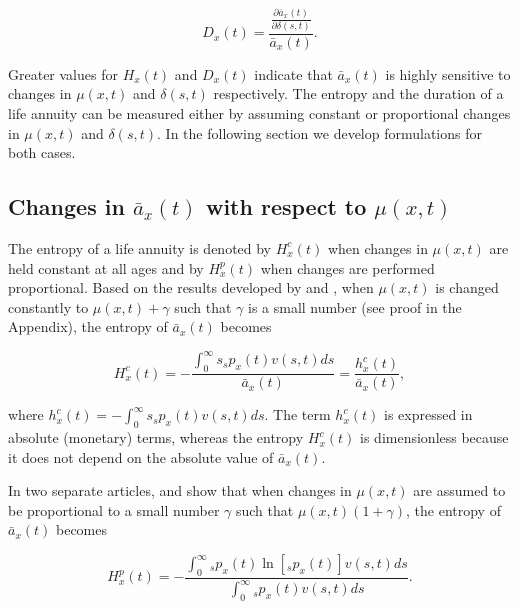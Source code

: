 \documentclass[12pt]{article}
\begin{document}
\begin{equation}\label{eq:DurationGeneral}
{D}_{x}(t) = \frac{ \frac{\partial \bar{a}_x(t) }{\partial \delta(s,t)}}{\bar{a}_x(t)}.
\end{equation}

Greater values for ${H}_{x}(t)$ and ${D}_{x}(t)$ indicate that $\bar{a}_x(t)$ is highly sensitive to changes in $\mu(x,t)$ and $\delta(s,t)$ respectively. The entropy and the duration of a life annuity can be measured either by assuming constant or proportional changes in $\mu(x,t)$ and $\delta(s,t)$. In the following section we develop formulations for both cases. 



\subsection{Changes in $\bar{a}_x(t)$ with respect to $\mu(x,t)$}

The entropy of a life annuity is denoted by ${H}^{c}_{x}(t)$ when changes in $\mu(x,t)$ are held constant at all ages and by ${H}^{p}_{x}(t)$ when  changes are performed proportional. Based on the results developed by \citet{Tsai2013a} and \citet{Lin2020}, when $\mu(x,t)$ is changed constantly to $\mu(x,t)+\gamma$ such that $\gamma$ is a small number (see proof in the Appendix), the entropy of $\bar{a}_x(t)$ becomes

\begin{equation}\label{eq:EntropyC}
{H}^{c}_{x}(t) = -\frac{\int_{0}^\infty s {}_sp_x(t) {v}(s,t) ds}{\bar{a}_x(t)}=\frac{{h}^{c}_{x}(t)}{\bar{a}_x(t)},
\end{equation}

where ${h}^{c}_{x}(t)=-\int_{0}^\infty s {}_sp_x(t) {v}(s,t) ds$. The term ${h}^{c}_{x}(t)$ is expressed in absolute (monetary) terms, whereas the entropy ${H}^{c}_{x}(t)$ is dimensionless because it does not depend on the absolute value of $\bar{a}_x(t)$.


In two separate articles, \citet{Haberman2011} and \citet{Tsai2013a} show that when changes in $\mu(x,t)$ are assumed to be proportional to a small number $\gamma$ such that $\mu(x,t)(1+\gamma)$, the entropy of $\bar{a}_x(t)$ becomes

\begin{equation} \label{eq:EntropyP}
{H}^{p}_{x}(t) = -\frac{ \int_{0}^{\infty}{}_sp_x(t)\ln[{}_sp_x(t)] {v}(s,t) ds}{\int_0^\infty {}_sp_x(t) {v}(s,t) ds}.
\end{equation}
\end{document}
